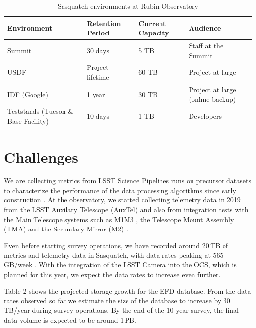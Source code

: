 \begin{table}[ht]
    \small
    \centering
    \caption{Sasquatch environments at Rubin Observatory}
    \begin{tabular}{@{}llll@{}}
        \toprule
        \textbf{Environment} & \textbf{Retention Period} & \textbf{Current Capacity} & \textbf{Audience} \\
        \midrule
        Summit & 30 days & 5 TB & Staff at the Summit \\
        USDF & Project lifetime & 60 TB & Project at large \\
        IDF (Google) & 1 year & 30 TB & Project at large (online backup) \\
        Teststands (Tucson \& Base Facility) & 10 days & 1 TB & Developers \\
        \bottomrule
    \end{tabular}
\end{table}

\section{Challenges}
\label{sec:challenges}

We are collecting metrics from LSST Science Pipelines runs on precursor datasets to characterize the performance of the data processing algorithms since early construction \cite{DMTN-091,2022SPIE12189E..0MG}. At the observatory, we started collecting telemetry data in 2019 from the LSST Auxilary Telescope (AuxTel) and also from integration tests with the Main Telescope systems such as M1M3 \cite{SITCOMTN-088}, the Telescope Mount Assembly (TMA) \cite{SITCOMTN-121} and the Secondary Mirror (M2) \cite{SITCOMTN-120}.

Even before starting survey operations, we have recorded around 20\,TB of metrics and telemetry data in Sasquatch, with data rates peaking at 565\,GB/week \cite{SQR-085}. With the integration of the LSST Camera into the OCS, which is planned for this year, we expect the data rates to increase even further.

Table 2 shows the projected storage growth for the EFD database. From the data rates observed so far we estimate the size of the database to increase by 30\,TB/year during survey operations. By the end of the 10-year survey, the final data volume is expected to be around 1\,PB.

